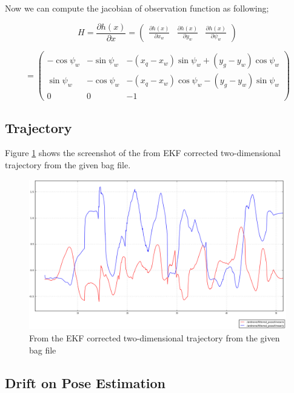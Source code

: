 \documentclass[14pt,a4paper]{article}
\begin{document}
			Now we can  compute the jacobian of observation function as following;
		
		$$
			H = \frac{\partial h(x)}{\partial x}
			  = \begin{pmatrix}
			  \frac{\partial h(x)}{\partial x_{w}} &
			  \frac{\partial h(x)}{\partial y_{w}} &
			  \frac{\partial h(x)}{\partial \psi_{w}}  			
			  \end{pmatrix}
		$$
		
		$$
			  = 
			  \begin{pmatrix}
					-\cos\psi_{w} & -\sin\psi_{w} & -(x_{q} - x_{w})\sin\psi_{w} +	(y_{g}-y_{w})\cos\psi_{w}\\  	
					\sin\psi_{w}  &	-\cos\psi_{w} & -(x_{q} - x_{w})\cos\psi_{w} -	(y_{g}-y_{w})\sin\psi_{w}\\
											0 & 0 & -1
			\end{pmatrix}
		$$
	\subsection{Trajectory}
		Figure \ref{graph:filtered_pose_corrected} shows the screenshot of the from EKF corrected two-dimensional trajectory from the given bag file.
	
	\begin{figure}[htbp]
	\centering
	\includegraphics[scale=0.4]{filtered_pose_corrected.png}
  	\caption{From the EKF corrected two-dimensional trajectory from the given bag file}
    \label{graph:filtered_pose_corrected}
	\end{figure}
		
	
	\subsection{Drift on Pose Estimation}
	
\end{document}
